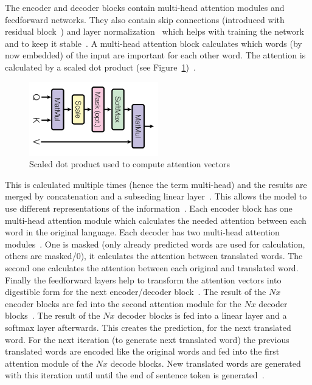 The encoder and decoder blocks contain multi-head attention modules and feedforward networks.
They also contain skip connections (introduced with residual block~\citep{he_deep_2015}) and layer
normalization~\citep{vaswani_attention_2017} which helps with training the network and to keep it
stable~\citep{liu_rethinking_2021}.
A multi-head attention block calculates which words (by now embedded) of the input are
important for each other word.
The attention is calculated by a scaled dot product (see
Figure~\ref{fig:transformer-dot-product})~\citep{vaswani_attention_2017}.
\begin{figure}[ht]
    \centering
    \includegraphics[width=0.5\textwidth]{img/Transformer-Scaled-Dot-Product-Vasani-Attention-2017.png}
    \caption[Computation of an attention mechanism]{%
        Scaled dot product used to compute attention
        vectors~\citep{vaswani_attention_2017}\label{fig:transformer-dot-product}
    }
\end{figure}
This is calculated multiple times (hence the term multi-head) and the results are merged by
concatenation and a subseding linear layer~\citep{vaswani_attention_2017}.
This allows the model to use different representations of the
information~\citep{vaswani_attention_2017}.
Each encoder block has one multi-head attention module which calculates the needed attention
between each word in the original language.
Each decoder has two multi-head attention modules~\citep{vaswani_attention_2017}.
One is masked (only already predicted words are used for calculation, others are masked/0), it
calculates the attention between translated words.
The second one calculates the attention between each original and translated word.
Finally the feedforward layers help to transform the attention vectors into digestible form for the
next encoder/decoder block~\citep{vaswani_attention_2017}.
The result of the $Nx$ encoder blocks are fed into the second attention module for the $Nx$ decoder
blocks~\citep{vaswani_attention_2017}.
The result of the $Nx$ decoder blocks is fed into a linear layer and a softmax layer afterwards.
This creates the prediction, for the next translated word.
For the next iteration (to generate next translated word) the previous translated words are encoded
like the original words and fed into the first attention module of the $Nx$ decode blocks.
New translated words are generated with this iteration until until the end of sentence token
is generated~\citep{vaswani_attention_2017}.

